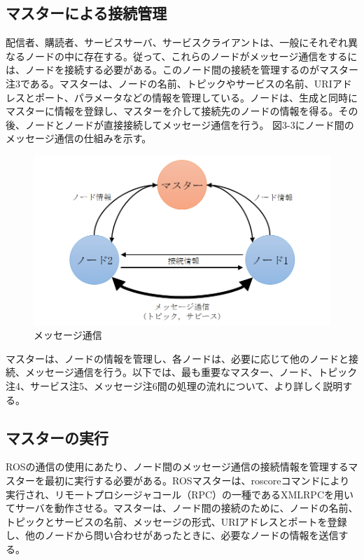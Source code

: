 \subsection{マスターによる接続管理}
配信者、購読者、サービスサーバ、サービスクライアントは、一般にそれぞれ異なるノードの中に存在する。従って、これらのノードがメッセージ通信をするには、ノードを接続する必要がある。このノード間の接続を管理するのがマスター注3である。マスターは、ノードの名前、トピックやサービスの名前、URIアドレスとポート、パラメータなどの情報を管理している。ノードは、生成と同時にマスターに情報を登録し、マスターを介して接続先のノードの情報を得る。その後、ノードとノードが直接接続してメッセージ通信を行う。
図3-3にノード間のメッセージ通信の仕組みを示す。

\begin{figure}[h]
  \centering
  \includegraphics[width=12cm]{pictures/chapter3/pic_03_03.png}
  \caption{メッセージ通信}
\end{figure}

マスターは、ノードの情報を管理し、各ノードは、必要に応じて他のノードと接続、メッセージ通信を行う。以下では、最も重要なマスター、ノード、トピック注4、サービス注5、メッセージ注6間の処理の流れについて、より詳しく説明する。

\subsection{マスターの実行}

ROSの通信の使用にあたり、ノード間のメッセージ通信の接続情報を管理するマスターを最初に実行する必要がある。ROSマスターは、roscoreコマンドにより実行され、リモートプロシージャコール（RPC）の一種であるXMLRPCを用いてサーバを動作させる。マスターは、ノード間の接続のために、ノードの名前、トピックとサービスの名前、メッセージの形式、URIアドレスとポートを登録し、他のノードから問い合わせがあったときに、必要なノードの情報を送信する。

